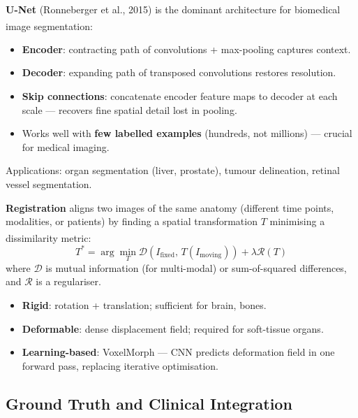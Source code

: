 \begin{tcbitemize}[ skin=sectionraster ]
    \tcbitem[title={U-Net: Segmentation for Medical Images}, raster multicolumn=3]
    \textbf{U-Net} (Ronneberger et al., 2015) is the dominant architecture for biomedical image segmentation\textsuperscript{\cite[][p.~234]{ronnebergerUnetConvolutionalNetworks2015}}:
    \begin{itemize}
        \item \textbf{Encoder}: contracting path of convolutions + max-pooling captures context.
        \item \textbf{Decoder}: expanding path of transposed convolutions restores resolution.
        \item \textbf{Skip connections}: concatenate encoder feature maps to decoder at each scale — recovers fine spatial detail lost in pooling.
        \item Works well with \textbf{few labelled examples} (hundreds, not millions) — crucial for medical imaging.
    \end{itemize}
    Applications: organ segmentation (liver, prostate), tumour delineation, retinal vessel segmentation.

    \tcbitem[title={Image Registration}, raster multicolumn=3]
    \textbf{Registration} aligns two images of the same anatomy (different time points, modalities, or patients) by finding a spatial transformation $T$ minimising a dissimilarity metric\textsuperscript{\cite[][pp.~315--360]{schweikardMedicalRobotics2015}}:
    \begin{equation}
        T^* = \arg\min_T \mathcal{D}(I_\text{fixed},\, T(I_\text{moving})) + \lambda \mathcal{R}(T)
    \end{equation}
    where $\mathcal{D}$ is mutual information (for multi-modal) or sum-of-squared differences, and $\mathcal{R}$ is a regulariser.
    \begin{itemize}
        \item \textbf{Rigid}: rotation + translation; sufficient for brain, bones.
        \item \textbf{Deformable}: dense displacement field; required for soft-tissue organs.
        \item \textbf{Learning-based}: VoxelMorph — CNN predicts deformation field in one forward pass, replacing iterative optimisation.
    \end{itemize}
\end{tcbitemize}

\subsection{Ground Truth and Clinical Integration}

